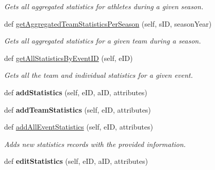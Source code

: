 \begin{DoxyCompactItemize}
\begin{DoxyCompactList}\small\item\em Gets all aggregated statistics for athletes during a given season. \end{DoxyCompactList}\item 
def \hyperlink{classhandler_1_1match__based__event_1_1_match_based_event_handler_a7c0283d57489e62153e13277594ff859}{get\+Aggregated\+Team\+Statistics\+Per\+Season} (self, s\+ID, season\+Year)
\begin{DoxyCompactList}\small\item\em Gets all aggregated statistics for a given team during a season. \end{DoxyCompactList}\item 
def \hyperlink{classhandler_1_1match__based__event_1_1_match_based_event_handler_a3196927bca3c695aa87beec2ced87dfd}{get\+All\+Statistics\+By\+Event\+ID} (self, e\+ID)
\begin{DoxyCompactList}\small\item\em Gets all the team and individual statistics for a given event. \end{DoxyCompactList}\item 
\mbox{\label{classhandler_1_1match__based__event_1_1_match_based_event_handler_a18c8f117e2e4bacd096e22e101e4000e}} 
def {\bfseries add\+Statistics} (self, e\+ID, a\+ID, attributes)
\item 
\mbox{\label{classhandler_1_1match__based__event_1_1_match_based_event_handler_a74cc0c7022f8e6947b9763f8cb4c3236}} 
def {\bfseries add\+Team\+Statistics} (self, e\+ID, attributes)
\item 
def \hyperlink{classhandler_1_1match__based__event_1_1_match_based_event_handler_a3db2c77ecdd1260e4f38eb1f1851312d}{add\+All\+Event\+Statistics} (self, e\+ID, attributes)
\begin{DoxyCompactList}\small\item\em Adds new statistics records with the provided information. \end{DoxyCompactList}\item 
\mbox{\label{classhandler_1_1match__based__event_1_1_match_based_event_handler_a7658ff1a1093daa70901c3d2f6be8a65}} 
def {\bfseries edit\+Statistics} (self, e\+ID, a\+ID, attributes)

\end{DoxyCompactItemize}
